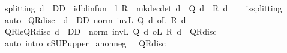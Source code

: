 \begin{isabellebody}
\endisatagproof
{\isafoldproof}%
%
\isadelimproof
\isanewline
%
\endisadelimproof
\isanewline
{}\isamarkupfalse%
\ splitting{\isacharcolon}{\kern0pt}\ {\isachardoublequoteopen}d\ {\isasymin}\ D\isactrlsub D\ {\isasymLongrightarrow}\ id{\isacharunderscore}{\kern0pt}blinfun\ {\isacharminus}{\kern0pt}\ l\ {\isacharasterisk}{\kern0pt}\isactrlsub R\ {\isasymP}\ {\isacharparenleft}{\kern0pt}mk{\isacharunderscore}{\kern0pt}dec{\isacharunderscore}{\kern0pt}det\ d{\isacharparenright}{\kern0pt}\ {\isacharequal}{\kern0pt}\ Q\ d\ {\isacharminus}{\kern0pt}\ R\ d{\isachardoublequoteclose}\isanewline
%
\isadelimproof
\ \ %
\endisadelimproof
%
\isatagproof
{}\isamarkupfalse%
\ is{\isacharunderscore}{\kern0pt}splitting\isanewline
\ \ \isamarkupfalse%
\ auto%
\endisatagproof
{\isafoldproof}%
%
\isadelimproof
%
\endisadelimproof
%
\isadelimdocument
%
\endisadelimdocument
%
\isatagdocument
%
\isamarkuptrue%
%
\endisatagdocument
{\isafolddocument}%
%
\isadelimdocument
%
\endisadelimdocument
{}\isamarkupfalse%
\ {\isachardoublequoteopen}QR{\isacharunderscore}{\kern0pt}disc\ {\isasymequiv}\ {\isacharparenleft}{\kern0pt}{\isasymSqunion}d\ {\isasymin}\ D\isactrlsub D{\isachardot}{\kern0pt}\ norm\ {\isacharparenleft}{\kern0pt}inv\isactrlsub L\ {\isacharparenleft}{\kern0pt}Q\ d{\isacharparenright}{\kern0pt}\ o\isactrlsub L\ R\ d{\isacharparenright}{\kern0pt}{\isacharparenright}{\kern0pt}{\isachardoublequoteclose}\isanewline
\isanewline
{}\isamarkupfalse%
\ QR{\isacharunderscore}{\kern0pt}le{\isacharunderscore}{\kern0pt}QR{\isacharunderscore}{\kern0pt}disc{\isacharcolon}{\kern0pt}\ {\isachardoublequoteopen}d\ {\isasymin}\ D\isactrlsub D\ {\isasymLongrightarrow}\ norm\ {\isacharparenleft}{\kern0pt}inv\isactrlsub L\ {\isacharparenleft}{\kern0pt}Q\ d{\isacharparenright}{\kern0pt}\ o\isactrlsub L\ {\isacharparenleft}{\kern0pt}R\ d{\isacharparenright}{\kern0pt}{\isacharparenright}{\kern0pt}\ {\isasymle}\ QR{\isacharunderscore}{\kern0pt}disc{\isachardoublequoteclose}\isanewline
%
\isadelimproof
\ \ %
\endisadelimproof
%
\isatagproof
{}\isamarkupfalse%
\ {\isacharparenleft}{\kern0pt}auto\ intro{\isacharcolon}{\kern0pt}\ cSUP{\isacharunderscore}{\kern0pt}upper{\isacharparenright}{\kern0pt}%
\endisatagproof
{\isafoldproof}%
%
\isadelimproof
\isanewline
%
\endisadelimproof
\isanewline
{}\isamarkupfalse%
\ a{\isacharunderscore}{\kern0pt}nonneg{\isacharcolon}{\kern0pt}\ {\isachardoublequoteopen}{}\ {\isasymle}\ QR{\isacharunderscore}{\kern0pt}disc{\isachardoublequoteclose}\isanewline

\end{isabellebody}
